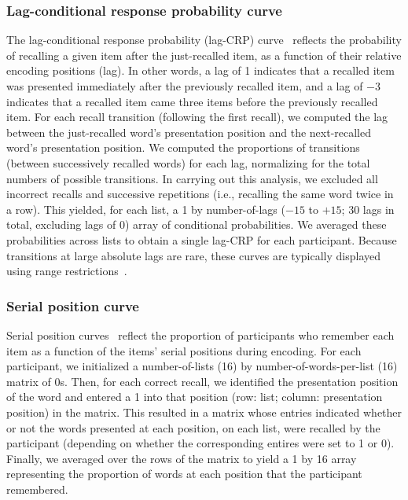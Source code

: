 \documentclass[11pt]{article}
\begin{document}
\subsubsection*{Lag-conditional response probability curve}

The lag-conditional response probability (lag-CRP) curve~\citep{Kaha96}
reflects the probability of recalling a given item after the just-recalled
item, as a function of their relative encoding positions (lag). In other words,
a lag of 1 indicates that a recalled item was presented immediately after the
previously recalled item, and a lag of $-3$ indicates that a recalled item came
three items before the previously recalled item. For each recall transition
(following the first recall), we computed the lag between the just-recalled
word's presentation position and the next-recalled word's presentation
position. We computed the proportions of transitions (between successively
recalled words) for each lag, normalizing for the total numbers of possible
transitions. In carrying out this analysis, we excluded all incorrect recalls
and successive repetitions (i.e., recalling the same word twice in a row). This
yielded, for each list, a 1 by number-of-lags ($-15$ to $+15$; 30 lags in
total, excluding lags of 0) array of conditional probabilities. We averaged
these probabilities across lists to obtain a single lag-CRP for each
participant. Because transitions at large absolute lags are rare, these curves
are typically displayed using range restrictions~\citep{Kaha12}.



\subsubsection*{Serial position curve}

Serial position curves~\citep{Murd62a} reflect the proportion of participants
who remember each item as a function of the items' serial positions during
encoding. For each participant, we initialized a number-of-lists (16) by
number-of-words-per-list (16) matrix of 0s. Then, for each correct recall, we
identified the presentation position of the word and entered a 1 into that
position (row: list; column: presentation position) in the matrix. This
resulted in a matrix whose entries indicated whether or not the words presented
at each position, on each list, were recalled by the participant (depending on
whether the corresponding entires were set to 1 or 0). Finally, we averaged
over the rows of the matrix to yield a 1 by 16 array representing the
proportion of words at each position that the participant remembered.
\end{document}
